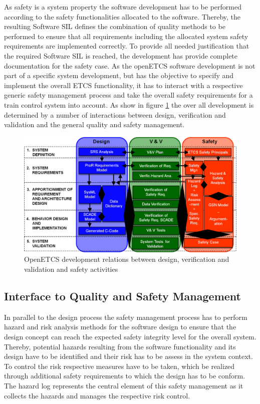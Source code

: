 \documentclass{template/openetcs_report}
\begin{document}
As safety is a system property the software development has to be performed according to the safety functionalities allocated to the software. Thereby, the resulting Software SIL defines the combination of quality methods to be performed to ensure that all requirements including the allocated system safety requirements are implemented correctly. To provide all needed justification that the required Software SIL is reached, the development has provide complete documentation for the safety case. As the openETCS software development is not part of a specific system development, but has the objective to specify and implement the overall ETCS functionality, it has to interact with a respective generic safety management process and take the overall safety requirements for a train control system into account. As show in figure \ref{fig:SafetyProcess} the over all development is determined by a number of interactions between design, verification and validation and the general quality and safety management.

\begin{figure}[htbp]
\centering
\includegraphics[width=1\linewidth]{./images/openETCS-Software-Safety-Development}
\caption{OpenETCS development relations between design, verification and validation and safety activities}
\label{fig:SafetyProcess}
\end{figure}


\subsection{Interface to Quality and Safety Management}

In parallel to the design process the safety management process has to perform hazard and risk analysis methods for the software design to ensure that the design concept can reach the expected safety integrity level for the overall system. Thereby, potential hazards resulting from the software functionality and its design have to be identified and their risk has to be assess in the system context. To control the risk respective measures have to be taken, which be realized through additional safety requirements to which the design has to be conform. The hazard log represents the central element of this safety management as it collects the hazards and manages the respective risk control.
\end{document}
